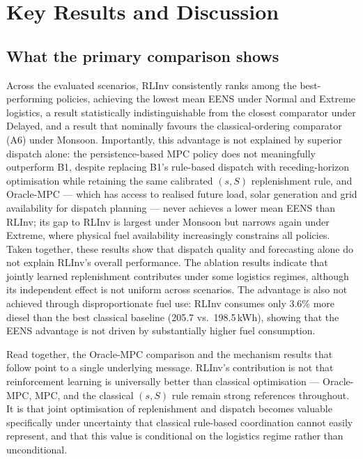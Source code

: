 \section{Key Results and Discussion}
\label{sec:conclusion_results}

\subsection{What the primary comparison shows}

Across the evaluated scenarios, RLInv consistently ranks among the
best-performing policies, achieving the lowest mean EENS under Normal
and Extreme logistics, a result statistically indistinguishable from
the closest comparator under Delayed, and a result that nominally
favours the classical-ordering comparator (A6) under Monsoon.
Importantly, this advantage is not explained by superior
dispatch alone: the persistence-based MPC policy does not
meaningfully outperform B1, despite replacing B1's rule-based dispatch
with receding-horizon optimisation while retaining the same calibrated
$(s,S)$ replenishment rule, and Oracle-MPC --- which has access to
realised future load, solar generation and grid availability for dispatch planning --- never
achieves a lower mean EENS than RLInv; its gap to RLInv is largest under
Monsoon but narrows again under Extreme, where physical fuel
availability increasingly constrains all policies. Taken together, these results show that dispatch quality and
forecasting alone do not explain RLInv's overall performance. The
ablation results indicate that jointly learned replenishment
contributes under some logistics regimes, although its independent
effect is not uniform across scenarios. The advantage is also not achieved through
disproportionate fuel use: RLInv consumes only 3.6\% more diesel than
the best classical baseline (205.7 vs.\ 198.5\,kWh), showing that the
EENS advantage is not driven by substantially higher fuel consumption.

Read together, the Oracle-MPC comparison and the mechanism results
that follow point to a single underlying message. RLInv's contribution
is not that reinforcement learning is universally better than classical
optimisation --- Oracle-MPC, MPC, and the classical $(s,S)$ rule remain
strong references throughout. It is that joint optimisation of
replenishment and dispatch becomes valuable specifically under
uncertainty that classical rule-based coordination cannot easily
represent, and that this value is conditional on the logistics regime
rather than unconditional.

